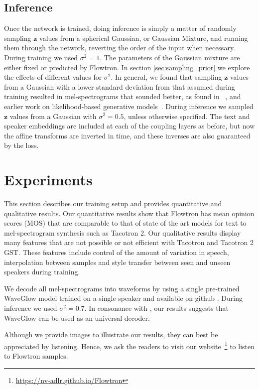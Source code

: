 \documentclass{article}
\begin{document}
\subsection{Inference}
Once the network is trained, doing inference is simply a matter of randomly sampling $\boldsymbol{z}$ values from a spherical Gaussian, or Gaussian Mixture, and running them through the network, reverting the order of the input when necessary. During training we used $\sigma^2=1$. The parameters of the Gaussian mixture are either fixed or predicted by Flowtron. In section \ref{sec:sampling_prior} we explore the effects of different values for $\sigma^2$.  In general, we found that sampling $\boldsymbol{z}$ values from a Gaussian with a lower standard deviation from that assumed during training resulted in mel-spectrograms that sounded better, as found in ~\cite{kingma2018glow}, and earlier work on likelihood-based generative models~\cite{parmar2018image}. During inference we sampled $\boldsymbol{z}$ values from a Gaussian with $\sigma^2 = 0.5$, unless otherwise specified. The text and speaker embeddings are included at each of the coupling layers as before, but now the affine transforms are inverted in time, and these inverses are also guaranteed by the loss. \section{Experiments}\label{sec:experiments}
This section describes our training setup and provides quantitative and qualitative results.
Our quantitative results show that Flowtron has mean opinion scores (MOS) that are comparable to that of state of the art models for text to mel-spectrogram synthesis such as Tacotron 2. Our qualitative results display many features that are not possible or not efficient with Tacotron and Tacotron 2 GST. These features include control of the amount of variation in speech, interpolation between samples and style transfer between seen and unseen speakers during training.

We decode all mel-spectrograms into waveforms by using a single pre-trained WaveGlow \cite{prenger2019waveglow} model trained on a single speaker and available on github \cite{mellotron2020github}. During inference we used $\sigma^2=0.7$. In consonance with \cite{valle2019mellotron}, our results suggests that WaveGlow can be used as an universal decoder.

Although we provide images to illustrate our results, they can best be appreciated by listening. Hence, we ask the readers to visit our website~\footnote{\href{https://nv-adlr.github.io/Flowtron}{https://nv-adlr.github.io/Flowtron}} to listen to Flowtron samples.
\end{document}
